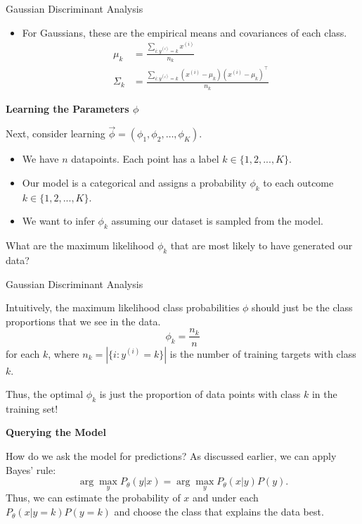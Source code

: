 \documentclass[../../generative_classifiers.tex]{subfiles}
\begin{document}
\begin{frame}[fragile]{Gaussian Discriminant Analysis}

\begin{itemize}
    \item For Gaussians, these are the empirical means and covariances of each class.
    \begin{align*}
    \mu_k & = \frac{\sum_{i: y^{(i)} = k} x^{(i)}}{n_k} \\
    \Sigma_k & = \frac{\sum_{i: y^{(i)} = k} (x^{(i)} - \mu_k)(x^{(i)} - \mu_k)^\top}{n_k} 
    \end{align*}
\end{itemize}

\textbf{Learning the Parameters $\phi$}


Next, consider learning $\vec \phi = (\phi_1, \phi_2, \ldots, \phi_K)$. 
\begin{itemize}
    \item We have $n$ datapoints. Each point has a label $k\in\{1,2,...,K\}$.
    \item Our model is a categorical and assigns a probability $\phi_k$ to each outcome $k\in\{1,2,...,K\}$.
    \item We want to infer $\phi_k$ assuming our dataset is sampled from the model.
\end{itemize}

What are the maximum likelihood $\phi_k$ that are most likely to have generated our data?


\end{frame}

\begin{frame}[fragile]{Gaussian Discriminant Analysis}

Intuitively, the maximum likelihood class probabilities $\phi$ should just be the class proportions that we see in the data. 
$$ \phi_k = \frac{n_k}{n}$$
for each $k$, where $n_k = |\{i : y^{(i)} = k\}|$ is the number of training targets with class $k$.

Thus, the optimal $\phi_k$ is just the proportion of data points with class $k$ in the training set!
\vspace{0.3cm}

\textbf{Querying the Model}

How do we ask the model for predictions? As discussed earlier, we can apply Bayes' rule:
$$\arg\max_y P_\theta(y|x) = \arg\max_y P_\theta(x|y)P(y).$$
Thus, we can estimate the probability of $x$ and under each $P_\theta(x|y=k)P(y=k)$ and choose the class that explains the data best.


\end{frame}
\end{document}
